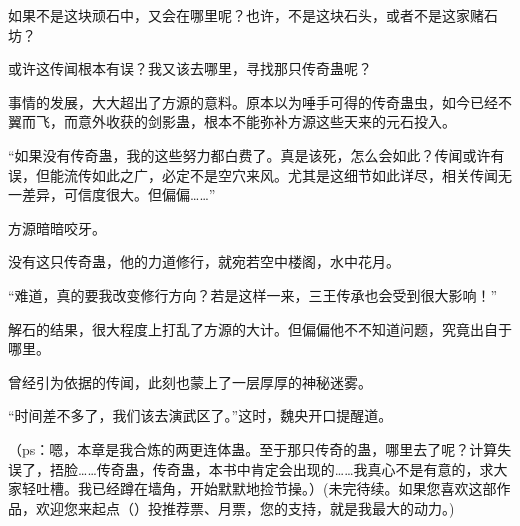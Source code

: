\begin{this_body}
如果不是这块顽石中，又会在哪里呢？也许，不是这块石头，或者不是这家赌石坊？

或许这传闻根本有误？我又该去哪里，寻找那只传奇蛊呢？

事情的发展，大大超出了方源的意料。原本以为唾手可得的传奇蛊虫，如今已经不翼而飞，而意外收获的剑影蛊，根本不能弥补方源这些天来的元石投入。

“如果没有传奇蛊，我的这些努力都白费了。真是该死，怎么会如此？传闻或许有误，但能流传如此之广，必定不是空穴来风。尤其是这细节如此详尽，相关传闻无一差异，可信度很大。但偏偏……”

方源暗暗咬牙。

没有这只传奇蛊，他的力道修行，就宛若空中楼阁，水中花月。

“难道，真的要我改变修行方向？若是这样一来，三王传承也会受到很大影响！”

解石的结果，很大程度上打乱了方源的大计。但偏偏他不不知道问题，究竟出自于哪里。

曾经引为依据的传闻，此刻也蒙上了一层厚厚的神秘迷雾。

“时间差不多了，我们该去演武区了。”这时，魏央开口提醒道。

（ps：嗯，本章是我合炼的两更连体蛊。至于那只传奇的蛊，哪里去了呢？计算失误了，捂脸……传奇蛊，传奇蛊，本书中肯定会出现的……我真心不是有意的，求大家轻吐槽。我已经蹲在墙角，开始默默地捡节操。）(未完待续。如果您喜欢这部作品，欢迎您来起点（）投推荐票、月票，您的支持，就是我最大的动力。)

\end{this_body}

